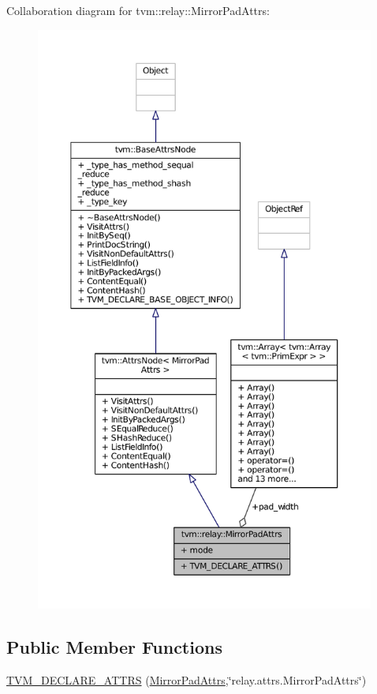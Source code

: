 Collaboration diagram for tvm\+:\+:relay\+:\+:Mirror\+Pad\+Attrs\+:
\nopagebreak
\begin{figure}[H]
\begin{center}
\leavevmode
\includegraphics[height=550pt]{structtvm_1_1relay_1_1MirrorPadAttrs__coll__graph}
\end{center}
\end{figure}
\subsection*{Public Member Functions}
\begin{DoxyCompactItemize}
\item 
\hyperlink{structtvm_1_1relay_1_1MirrorPadAttrs_a239c491d89ed613cc83f2a056ff2a01c}{T\+V\+M\+\_\+\+D\+E\+C\+L\+A\+R\+E\+\_\+\+A\+T\+T\+RS} (\hyperlink{structtvm_1_1relay_1_1MirrorPadAttrs}{Mirror\+Pad\+Attrs},\char`\"{}relay.\+attrs.\+Mirror\+Pad\+Attrs\char`\"{})
\end{DoxyCompactItemize}
